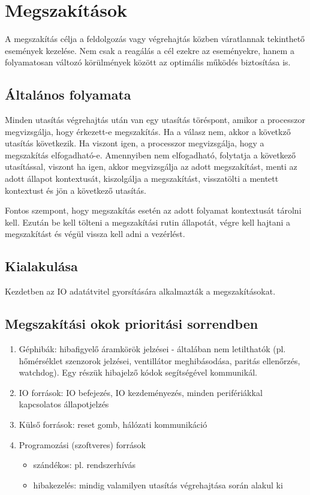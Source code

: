 
\chapter{Megszakítások}

A megszakítás célja a feldolgozás vagy végrehajtás közben váratlannak tekinthető események kezelése.
Nem csak a reagálás a cél ezekre az eseményekre, hanem a folyamatosan változó körülmények között az optimális működés biztosítása is.

\section{Általános folyamata}
Minden utasítás végrehajtás után van egy utasítás töréspont, amikor a processzor megvizsgálja, hogy érkezett-e megszakítás.
Ha a válasz nem, akkor a követkző utasítás következik.
Ha viszont igen, a processzor megvizsgálja, hogy a megszakítás elfogadható-e.
Amennyiben nem elfogadható, folytatja a következő utasítással, viszont ha igen, akkor megvizsgálja az adott megszakítást, menti az adott állapot kontextusát, kiszolgálja a megszakítást, visszatölti a mentett kontextust és jön a következő utasítás.

Fontos szempont, hogy megszakítás esetén az adott folyamat kontextusát tárolni kell.
Ezután be kell tölteni a megszakítási rutin állapotát, végre kell hajtani a megszakítást és végül vissza kell adni a vezérlést.

\section{Kialakulása}
Kezdetben az IO adatátvitel gyorsítására alkalmazták a megszakításokat.

\section{Megszakítási okok prioritási sorrendben}
\begin{enumerate}
    \item Géphibák: hibafigyelő áramkörök jelzései - általában nem letilthatók (pl. hőmérséklet szenzorok jelzései, ventillátor meghibásodása, paritás ellenőrzés, watchdog). Egy részük hibajelző kódok segítségével kommunikál.
    \item IO források: IO befejezés, IO kezdeményezés, minden perifériákkal kapcsolatos állapotjelzés
    \item Külső források: reset gomb, hálózati kommunikáció
    \item Programozási (szoftveres) források
    \begin{itemize}
        \item szándékos: pl. rendszerhívás
        \item hibakezelés: mindig valamilyen utasítás végrehajtása során alakul ki 
    \end{itemize}
\end{enumerate}


